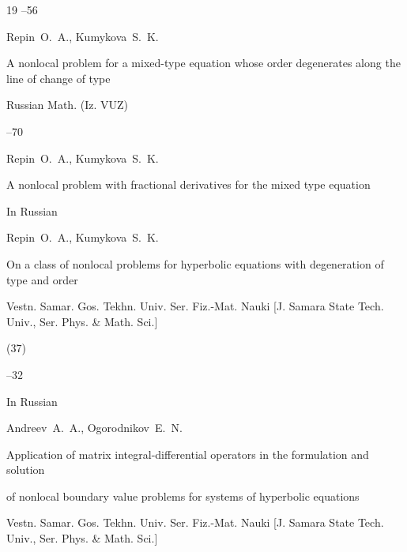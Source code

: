 \begin{thebibliography}{19}
--56



\by Repin~O.~A., Kumykova~S.~K.

\paper A nonlocal problem for a mixed-type equation whose order degenerates along the line of change of type




\jour Russian Math. (Iz. VUZ)




--70



\by Repin~O.~A., Kumykova~S.~K.

\paper A nonlocal problem with fractional derivatives for the mixed type equation






\lang In Russian

\by Repin~O.~A., Kumykova~S.~K.

\paper On a class of nonlocal problems for hyperbolic equations with degeneration of type and order

\jour  Vestn. Samar. Gos. Tekhn. Univ. Ser. Fiz.-Mat. Nauki \rm [J. Samara State Tech. Univ., Ser. Phys. \& Math. Sci.]


(37)

--32





\lang In Russian

\by Andreev~A.~A., Ogorodnikov~E.~N.

\paper Application of matrix integral-differential operators in the formulation and solution 

of nonlocal boundary value problems for systems of hyperbolic equations

\jour  Vestn. Samar. Gos. Tekhn. Univ. Ser. Fiz.-Mat. Nauki \rm [J. Samara State Tech. Univ., Ser. Phys. \& Math. Sci.]


\end{thebibliography}
